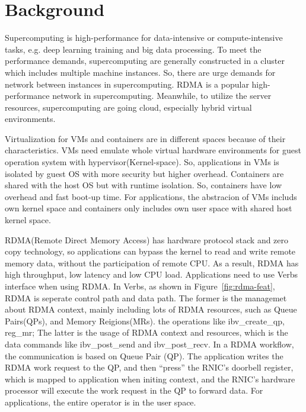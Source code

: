 \section{Background}

Supercomputing is high-performance for data-intensive or compute-intensive tasks, e.g. deep learning training and big data processing. To meet the performance demands, supercomputing are generally constructed in a cluster which includes multiple machine instances. So, there are urge demands for network between instances in supercomputing. RDMA is a popular high-performance network in supercomputing. Meanwhile, to utilize the server resources, supercomputing are going cloud, especially hybrid virtual environments.

Virtualization for VMs and containers are in different spaces because of their characteristics. VMs need emulate whole virtual hardware environments for guest operation system with hypervisor(Kernel-space). So, applications in VMs is isolated by guest OS with more security but higher overhead. Containers are shared with the host OS but with runtime isolation. So, containers have low overhead and fast boot-up time. For applications, the abstracion of VMs includs own kernel space and containers only includes own user space with shared host kernel space.

RDMA(Remote Direct Memory Access) has hardware protocol stack and zero copy technology, so applications can bypass the kernel to read and write remote memory data, without the participation of remote CPU. As a result, RDMA has high throughput, low latency and low CPU load. Applications need to use Verbs interface when using RDMA. In Verbs, as shown in Figure~\ref{fig:rdma-feat}, RDMA is seperate control path and data path. The former is the managemet about RDMA context, mainly including lots of RDMA resources, such as Queue Pairs(QPs), and Memory Reigions(MRs). the operations like ibv\_create\_qp, reg\_mr; The latter is the usage of RDMA context and resources,  which is the data commands like ibv\_post\_send and ibv\_post\_recv. In a RDMA workflow, the communication is based on Queue Pair (QP). The application writes the RDMA work request to the QP, and then ``press''  the RNIC's doorbell register, which is mapped to application when initing context, and the RNIC's hardware processor will execute the work request in the QP to forward data. For applications, the entire operator is in the user space.

